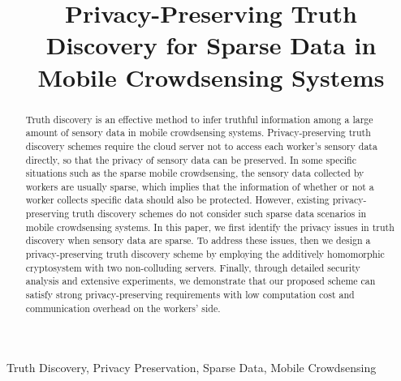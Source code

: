 \documentclass[conference]{IEEEtran}
\begin{document}
\title{Privacy-Preserving Truth Discovery for Sparse Data in Mobile Crowdsensing Systems\\
}

\author{
}
\maketitle

\begin{abstract}
Truth discovery is an effective method to infer truthful information among a large amount of sensory data in mobile crowdsensing systems.
Privacy-preserving truth discovery schemes require the cloud server not to access each worker's sensory data directly, so that the privacy of sensory data can be preserved.
In some specific situations such as the sparse mobile crowdsensing, the sensory data collected by workers are usually sparse, which implies that the information of whether or not a worker collects specific data should also be protected.
However, existing privacy-preserving truth discovery schemes do not consider such sparse data scenarios in mobile crowdsensing systems.
In this paper, we first identify the privacy issues in truth discovery when sensory data are sparse.
To address these issues, then we design a privacy-preserving truth discovery scheme by employing the additively homomorphic cryptosystem with two non-colluding servers.
Finally, through detailed security analysis and extensive experiments, we demonstrate that our proposed scheme can satisfy strong privacy-preserving requirements with low computation cost and communication overhead on the workers' side.
\end{abstract}
\begin{IEEEkeywords}
Truth Discovery, Privacy Preservation, Sparse Data, Mobile Crowdsensing
\end{IEEEkeywords}
\end{document}
